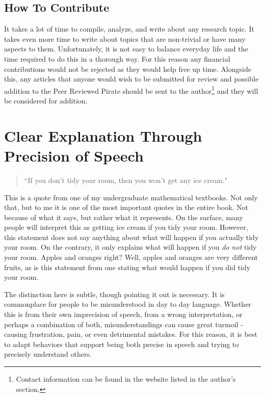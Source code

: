 \documentclass[10pt, a4paper, twocolumn]{book}
\begin{document}
\subsection{How To Contribute}

It takes a lot of time to compile, analyze, and write about any research topic. It takes even more time to write about topics that are non-trivial or have many aspects to them. Unfortunately, it is not easy to balance everyday life and the time required to do this in a thorough way. For this reason any financial contributions would not be rejected as they would help free up time. Alongside this, any articles that anyone would wish to be submitted for review and possible addition to the Peer Reviewed Pirate should be sent to the author\footnote{Contact information can be found in the website listed in the author's section.} and they will be considered for addition.














\sectionEnd

\section{Clear Explanation Through Precision of Speech}

\begin{quotation}
	``If you don't tidy your room, then you won't get any ice cream." \citep{HowToThinkLikeAMathematician}
\end{quotation}

This is a quote from one of my undergraduate mathematical textbooks. Not only that, but to me it is one of the most important quotes in the entire book. Not because of what it says, but rather what it represents. On the surface, many people will interpret this as getting ice cream if you tidy your room. However, this statement does not say anything about what will happen if you actually tidy your room. On the contrary, it only explains what will happen if you \textit{do not} tidy your room. Apples and oranges right? Well, apples and oranges are very different fruits, as is this statement from one stating what would happen if you did tidy your room.

The distinction here is subtle, though pointing it out is necessary. It is commonplace for people to be misunderstood in day to day language. Whether this is from their own imprecision of speech, from a wrong interpretation, or perhaps a combination of both, misunderstandings can cause great turmoil - causing frustration, pain, or even detrimental mistakes. For this reason, it is best to adapt behaviors that support being both precise in speech and trying to precisely understand others. 
\end{document}

